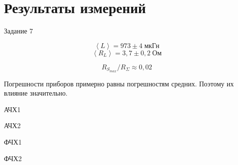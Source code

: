 \section{Результаты измерений}
\begin{table}[!ht]
    \centering
    \caption{Задание 7}
    \resizebox{\columnwidth}{!}{}
\end{table}
\[
    \left<L\right> = 973 \pm 4\;\text{мкГн}
\]
\[
    \left<R_{L}\right> = 3{,}7 \pm 0{,}2\;\text{Ом}
\]

\[
    R_{S_{max}} / R_{ \Sigma} \approx 0{,}02
\]

Погрешности приборов примерно равны погрешностям средних. Поэтому их влияние значительно.

\begin{table}[!ht]
    \centering
    \caption{АЧХ1}
    
\end{table}

\begin{table}[!ht]
    \centering
    \caption{АЧХ2}
    
\end{table}

\begin{table}[!ht]
    \centering
    \caption{ФЧХ1}
    
\end{table}

\begin{table}[!ht]
    \centering
    \caption{ФЧХ2}
    
\end{table}


\begin{figure}[ht!]
\end{figure}

